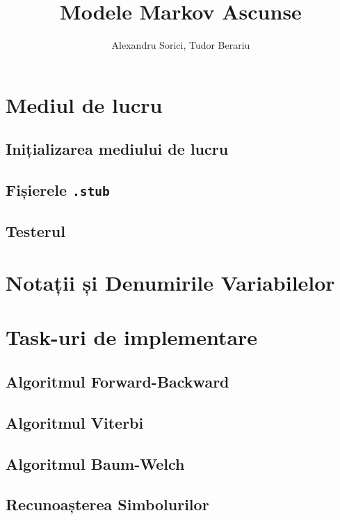 \documentclass{article}
\title{Modele Markov Ascunse}
\author{Alexandru Sorici, Tudor Berariu}
\institute{Asociația Română pentru Inteligență Artificială}
\begin{document}
\mytitlepage

\section{Mediul de lucru}
\label{sec:framework}

\subsection{Inițializarea mediului de lucru}
\label{sec:init}

\subsection{Fișierele \texttt{.stub}}
\label{sec:stubs}

\subsection{Testerul}
\label{sec:tester}


\section{Notații și Denumirile Variabilelor}
\label{sec:notations}

\section{Task-uri de implementare}
\label{sec:tasks}

\subsection{Algoritmul Forward-Backward}
\label{sec:fb}

\subsection{Algoritmul Viterbi}
\label{sec:viterbi}

\subsection{Algoritmul Baum-Welch}
\label{sec:baum-welch}

\subsection{Recunoașterea Simbolurilor}
\label{sec:symbol-recognition}
\end{document}
